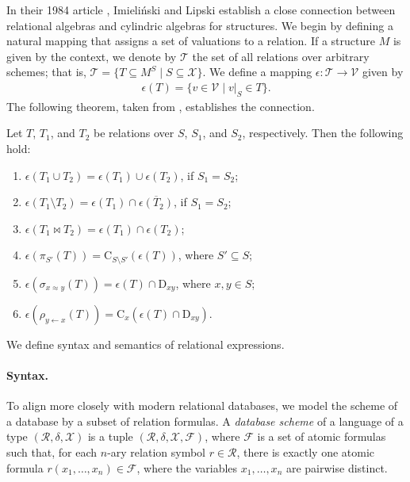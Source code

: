 \documentclass{lmcs}
\def\tu#1{( #1)}
\def\C{\textrm{C}}
\def\D{\textrm{D}}
\def\R{\mathcal R}
\def\T{\mathcal T}
\def\X{\mathcal X}
\def\F{\mathcal F}
\def\V{\mathcal V}
\newcommand{\st}{%
	\ensuremath{\;|\;}
}
\begin{document}
In their 1984 article \cite{ImLi1982}, Imieliński and Lipski establish a close connection between relational algebras and cylindric algebras for structures. We begin by defining a natural mapping that assigns a set of valuations to a relation. If a structure $M$ is given by the context, we denote by $\T$ the set of all relations over arbitrary schemes; that is, $\T=\{T\subseteq M^S\st S\subseteq \X\}$. We define a mapping $\epsilon\!:\T\to\V$ given by
\begin{align}
\epsilon(T)=\{v\in\V\st v|_S\in T\}. 
\end{align}
The following theorem, taken from \cite{ImLi1982}, establishes the connection.
\begin{thm}\label{thm:imli}
Let $T$, $T_1$, and $T_2$ be relations over $S$, $S_1$, and $S_2$, respectively. Then the following hold:
\begin{enumerate}
\item  $\epsilon(T_1\cup T_2)=\epsilon(T_1)\cup \epsilon(T_2)$, if $S_1=S_2$;
\item  $\epsilon(T_1\setminus T_2)=\epsilon(T_1)\cap \overline{\epsilon(T_2)}$, if $S_1=S_2$;
\item $\epsilon(T_1\bowtie T_2)=\epsilon(T_1)\cap \epsilon(T_2)$;
\item $\epsilon(\pi_{S'}(T))=\C_{S\setminus S'}(\epsilon(T))$, where $S'\subseteq S$;
\item $\epsilon(\sigma_{x\approx y}(T))=\epsilon(T)\cap\D_{xy}$, where $x,y\in S$;
\item $\epsilon(\rho_{y\leftarrow x}(T))=\C_x(\epsilon(T)\cap\D_{xy})$.
\end{enumerate}
 \end{thm}

We define syntax and semantics of relational expressions.
\paragraph{Syntax.} To align more closely with modern relational databases, we model the scheme of a database by a subset of relation formulas. A \emph{database scheme} of a language of a type $\tu{\R,\delta,\X}$ is a tuple $\tu{\R,\delta,\X,\F}$, where $\F$ is a set of atomic formulas such that, for each $n$-ary relation symbol $r\in \R$, there is exactly one atomic formula $r(x_1,\ldots,x_n)\in\F$, where the variables $x_1,\ldots,x_n$ are pairwise distinct.  
\end{document}
